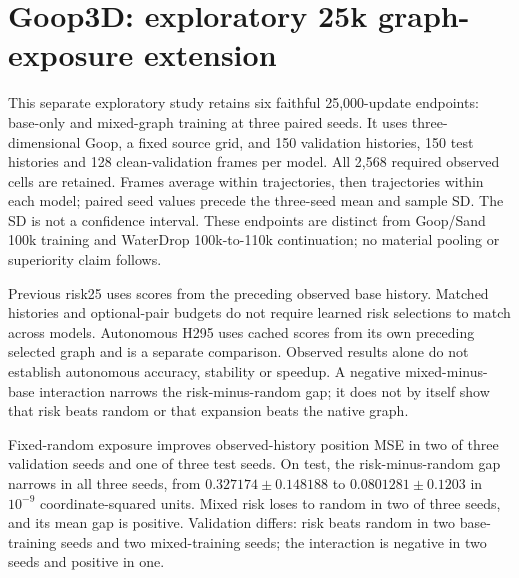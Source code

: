 \section{Goop3D: exploratory 25k graph-exposure extension}
\label{sec:goop3d-25k-exposure}
This separate exploratory study retains six faithful 25,000-update endpoints: base-only and mixed-graph training at three paired seeds. It uses three-dimensional Goop, a fixed source grid, and 150 validation histories, 150 test histories and 128 clean-validation frames per model. All 2,568 required observed cells are retained. Frames average within trajectories, then trajectories within each model; paired seed values precede the three-seed mean and sample SD. The SD is not a confidence interval. These endpoints are distinct from Goop/Sand 100k training and WaterDrop 100k-to-110k continuation; no material pooling or superiority claim follows.

Previous risk25 uses scores from the preceding observed base history. Matched histories and optional-pair budgets do not require learned risk selections to match across models. Autonomous H295 uses cached scores from its own preceding selected graph and is a separate comparison. Observed results alone do not establish autonomous accuracy, stability or speedup. A negative mixed-minus-base interaction narrows the risk-minus-random gap; it does not by itself show that risk beats random or that expansion beats the native graph.

Fixed-random exposure improves observed-history position MSE in two of three validation seeds and one of three test seeds. On test, the risk-minus-random gap narrows in all three seeds, from $0.327174\pm0.148188$ to $0.0801281\pm0.1203$ in $10^{-9}$ coordinate-squared units. Mixed risk loses to random in two of three seeds, and its mean gap is positive. Validation differs: risk beats random in two base-training seeds and two mixed-training seeds; the interaction is negative in two seeds and positive in one.


